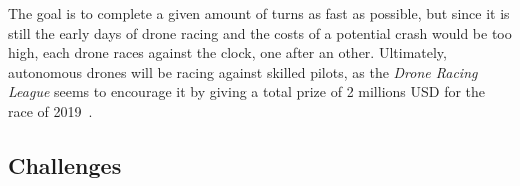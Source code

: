 The goal is to complete a given amount of turns as fast as possible, but since
it is still the early days of drone racing and the costs of a potential crash
would be too high, each drone races against the clock, one after an other.
Ultimately, autonomous drones will be racing against skilled pilots, as the
\emph{Drone Racing League} seems to encourage it by giving a total prize of 2
millions USD for the race of 2019~\cite{LockheedDRL}.


\subsection{Challenges}

